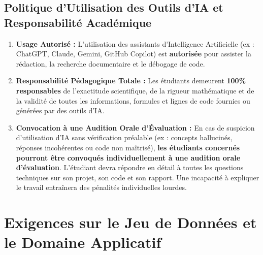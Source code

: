 \documentclass[11pt,a4paper]{article}
\begin{document}
\subsection{Politique d'Utilisation des Outils d'IA et Responsabilité Académique}
\begin{tcolorbox}[colback=sintefblue!10, colframe=sintefblue, title=\textbf{POLITIQUE D'USAGE DES OUTILS D'IA ET AUDIT D'AUTHENTICITÉ}, arc=2mm]
    \begin{enumerate}[leftmargin=*]
        \item \textbf{Usage Autorisé :} L'utilisation des assistants d'Intelligence Artificielle (ex : ChatGPT, Claude, Gemini, GitHub Copilot) est \textbf{autorisée} pour assister la rédaction, la recherche documentaire et le débogage de code.
        \item \textbf{Responsabilité Pédagogique Totale :} Les étudiants demeurent \textbf{100\% responsables} de l'exactitude scientifique, de la rigueur mathématique et de la validité de toutes les informations, formules et lignes de code fournies ou générées par des outils d'IA.
        \item \textbf{Convocation à une Audition Orale d'Évaluation :} En cas de suspicion d'utilisation d'IA sans vérification préalable (ex : concepts hallucinés, réponses incohérentes ou code non maîtrisé), \textbf{les étudiants concernés pourront être convoqués individuellement à une audition orale d'évaluation}. L'étudiant devra répondre en détail à toutes les questions techniques sur son projet, son code et son rapport. Une incapacité à expliquer le travail entraînera des pénalités individuelles lourdes.
    \end{enumerate}
\end{tcolorbox}

\section{Exigences sur le Jeu de Données et le Domaine Applicatif}
\end{document}
